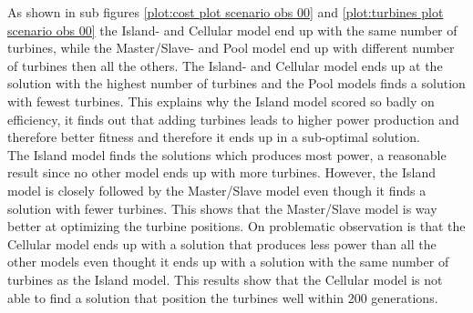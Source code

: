 \noindent As shown in sub figures \ref{plot:cost plot scenario obs 00} and \ref{plot:turbines plot scenario obs 00} the Island- and Cellular model end up with the same number of turbines, while the Master/Slave- and Pool model end up with different number of turbines then all the others. The Island- and Cellular model ends up at the solution with the highest number of turbines and the Pool models finds a solution with fewest turbines. This explains why the Island model scored so badly on efficiency, it finds out that adding turbines leads to higher power production and therefore better fitness and therefore it ends up in a sub-optimal solution. \\


\noindent The Island model finds the solutions which produces most power, a reasonable result since no other model ends up with more turbines. However, the Island model is closely followed by the Master/Slave model even though it finds a solution with fewer turbines. This shows that the Master/Slave model is way better at optimizing the turbine positions. On problematic observation is that the Cellular model ends up with a solution that produces less power than all the other models even thought it ends up with a solution with the same number of turbines as the Island model. This results show that the Cellular model is not able to find a solution that position the turbines well within 200 generations. \\


